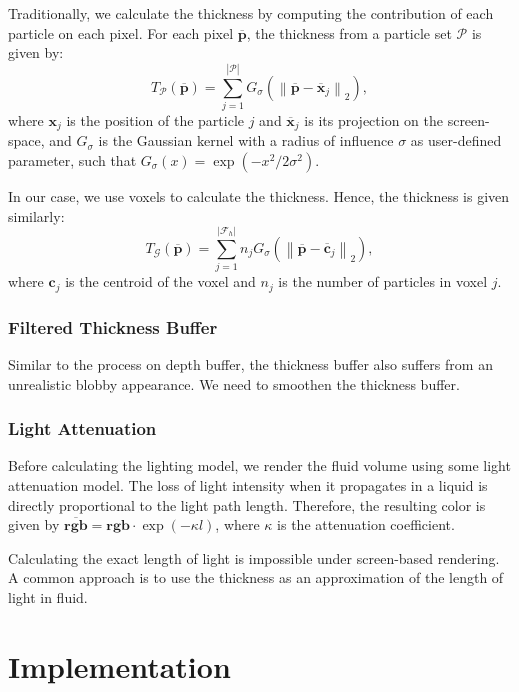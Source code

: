 \documentclass[sigconf]{acmart}
\begin{document}
Traditionally, we calculate the thickness by computing the contribution of each particle on each pixel. For each pixel $\overline{\mathbf{p}}$, the thickness from a particle set $\mathcal P$ is given by:
\begin{equation}
    T_{\mathcal P}\left(\overline{\mathbf{p}}\right) = \sum_{j=1}^{|\mathcal P|}G_{\sigma}\left(\left \lVert \overline{\mathbf{p}} - {\overline{\mathbf{x}}}_j \right \rVert_2 \right),
\end{equation}
where $\mathbf{x}_j$ is the position of the particle $j$ and ${\overline{\mathbf{x}}}_j$ is its projection on the screen-space,
and $G_{\sigma}$ is the Gaussian kernel with a radius of influence $\sigma$ as user-defined parameter, such that $G_\sigma (x) = \exp \left(-x^2 / 2 \sigma^2\right)$.

In our case, we use voxels to calculate the thickness. Hence, the thickness is given similarly:
\begin{equation}
    T_{\mathcal G}\left(\overline{\mathbf{p}}\right) = \sum_{j=1}^{|\mathcal F_h|}n_j G_{\sigma}\left(\left \lVert \overline{\mathbf{p}} - {\overline{\mathbf{c}}}_j \right \rVert_2 \right),
\end{equation}
where $\mathbf c_j$ is the centroid of the voxel and $n_j$ is the number of particles in voxel $j$.

\subsubsection{Filtered Thickness Buffer}
Similar to the process on depth buffer, the thickness buffer also suffers from an unrealistic blobby appearance. We need to smoothen the thickness buffer.

\subsubsection{Light Attenuation}
Before calculating the lighting model, we render the fluid volume using some light attenuation model. The loss of light intensity when it propagates
in a liquid is directly proportional to the light path length. Therefore, the resulting color is given by $\overline{\mathbf{rgb}} = \mathbf{rgb}\cdot \exp (-\kappa l)$, where $\kappa$ is the attenuation coefficient.

Calculating the exact length of light is impossible under screen-based rendering. A common approach is to use the thickness as an approximation of the length of light in fluid.

\section{Implementation}
\end{document}
